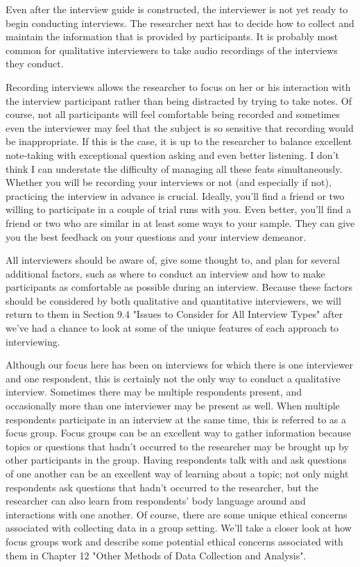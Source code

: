 Even after the interview guide is constructed, the interviewer is not yet ready to begin conducting interviews. The researcher next has to decide how to collect and maintain the information that is provided by participants. It is probably most common for qualitative interviewers to take audio recordings of the interviews they conduct.

Recording interviews allows the researcher to focus on her or his interaction with the interview participant rather than being distracted by trying to take notes. Of course, not all participants will feel comfortable being recorded and sometimes even the interviewer may feel that the subject is so sensitive that recording would be inappropriate. If this is the case, it is up to the researcher to balance excellent note-taking with exceptional question asking and even better listening. I don’t think I can understate the difficulty of managing all these feats simultaneously. Whether you will be recording your interviews or not (and especially if not), practicing the interview in advance is crucial. Ideally, you’ll find a friend or two willing to participate in a couple of trial runs with you. Even better, you’ll find a friend or two who are similar in at least some ways to your sample. They can give you the best feedback on your questions and your interview demeanor.

All interviewers should be aware of, give some thought to, and plan for several additional factors, such as where to conduct an interview and how to make participants as comfortable as possible during an interview. Because these factors should be considered by both qualitative and quantitative interviewers, we will return to them in Section 9.4 "Issues to Consider for All Interview Types" after we’ve had a chance to look at some of the unique features of each approach to interviewing.

Although our focus here has been on interviews for which there is one interviewer and one respondent, this is certainly not the only way to conduct a qualitative interview. Sometimes there may be multiple respondents present, and occasionally more than one interviewer may be present as well. When multiple respondents participate in an interview at the same time, this is referred to as a focus group. Focus groups can be an excellent way to gather information because topics or questions that hadn’t occurred to the researcher may be brought up by other participants in the group. Having respondents talk with and ask questions of one another can be an excellent way of learning about a topic; not only might respondents ask questions that hadn’t occurred to the researcher, but the researcher can also learn from respondents’ body language around and interactions with one another. Of course, there are some unique ethical concerns associated with collecting data in a group setting. We’ll take a closer look at how focus groups work and describe some potential ethical concerns associated with them in Chapter 12 "Other Methods of Data Collection and Analysis".

